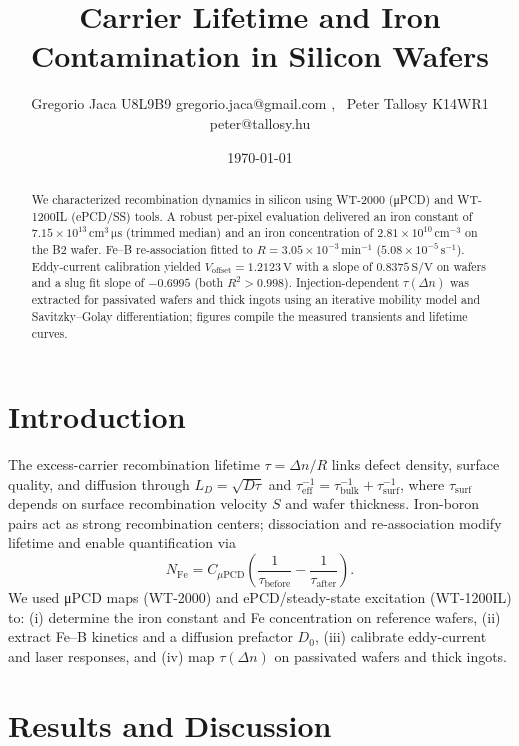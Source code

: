 \documentclass[12pt,a4paper]{article}
\title{Carrier Lifetime and Iron Contamination in Silicon Wafers}
\author{Gregorio Jaca U8L9B9 gregorio.jaca@gmail.com , \ Peter Tallosy K14WR1 peter@tallosy.hu }
\date{\today}
\begin{document}
\maketitle

\begin{abstract}
We characterized recombination dynamics in silicon using WT-2000 (μPCD) and WT-1200IL (ePCD/SS) tools. A robust per-pixel evaluation delivered an iron constant of $7.15\times10^{13}\,\mathrm{cm^{3}\,\mu s}$ (trimmed median) and an iron concentration of $2.81\times10^{10}\,\mathrm{cm^{-3}}$ on the B2 wafer. Fe--B re-association fitted to $R=3.05\times10^{-3}\,\mathrm{min^{-1}}$ ($5.08\times10^{-5}\,\mathrm{s^{-1}}$). Eddy-current calibration yielded $V_{\text{offset}}=1.2123\,\mathrm{V}$ with a slope of $0.8375\,\mathrm{S/V}$ on wafers and a slug fit slope of $-0.6995$ (both $R^2>0.998$). Injection-dependent $\tau(\Delta n)$ was extracted for passivated wafers and thick ingots using an iterative mobility model and Savitzky--Golay differentiation; figures compile the measured transients and lifetime curves.
\end{abstract}

\section{Introduction}
The excess-carrier recombination lifetime $\tau=\Delta n/R$ links defect density, surface quality, and diffusion through $L_{D}=\sqrt{D\tau}$ and $\tau_{\text{eff}}^{-1}=\tau_{\text{bulk}}^{-1}+\tau_{\text{surf}}^{-1}$, where $\tau_{\text{surf}}$ depends on surface recombination velocity $S$ and wafer thickness. Iron-boron pairs act as strong recombination centers; dissociation and re-association modify lifetime and enable quantification via
\begin{equation}
N_{\mathrm{Fe}} = C_{\mu\mathrm{PCD}}\left(\frac{1}{\tau_{\text{before}}}-\frac{1}{\tau_{\text{after}}}\right).
\end{equation}
We used μPCD maps (WT-2000) and ePCD/steady-state excitation (WT-1200IL) to: (i) determine the iron constant and Fe concentration on reference wafers, (ii) extract Fe--B kinetics and a diffusion prefactor $D_0$, (iii) calibrate eddy-current and laser responses, and (iv) map $\tau(\Delta n)$ on passivated wafers and thick ingots.

\section{Results and Discussion}
\end{document}
